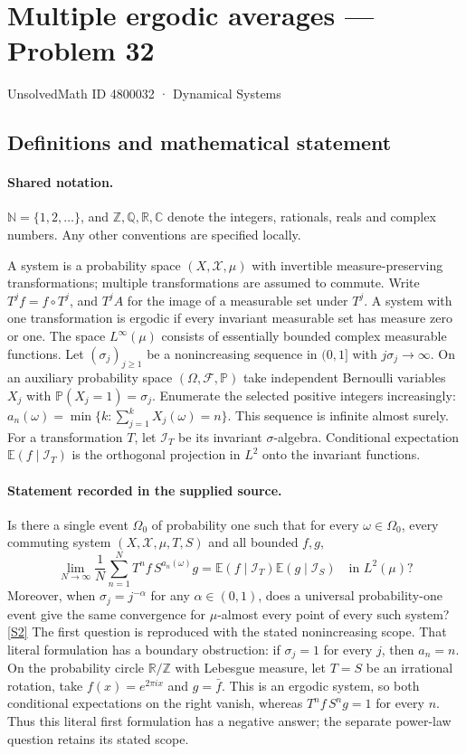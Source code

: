 \documentclass[11pt]{article}
\newcommand{\sref}[2]{\hyperlink{source:#1:#2}{[S#2]}}
\begin{document}
\setcounter{section}{4800031}
\section{Multiple ergodic averages — Problem 32}\label{4800032}
{\small\sffamily UnsolvedMath ID 4800032 · Dynamical Systems}
\subsection{Definitions and mathematical statement}

\paragraph{Shared notation.}$\mathbb N=\{1,2,\ldots\}$, and $\mathbb Z,\mathbb Q,\mathbb R,\mathbb C$ denote the integers, rationals, reals and complex numbers. Any other conventions are specified locally.


A system is a probability space $(X,\mathcal X,\mu)$ with invertible measure-preserving transformations; multiple transformations are assumed to commute. Write $T^j f=f\circ T^j$, and $T^j A$ for the image of a measurable set under $T^j$. A system with one transformation is ergodic if every invariant measurable set has measure zero or one. The space $L^\infty(\mu)$ consists of essentially bounded complex measurable functions. Let $(\sigma_j)_{j\ge1}$ be a nonincreasing sequence in $(0,1]$ with $j\sigma_j\to\infty$. On an auxiliary probability space $(\Omega,\mathcal F,\mathbb P)$ take independent Bernoulli variables $X_j$ with $\mathbb P(X_j=1)=\sigma_j$. Enumerate the selected positive integers increasingly: $a_n(\omega)=\min\{k:\sum_{j=1}^kX_j(\omega)=n\}$. This sequence is infinite almost surely. For a transformation $T$, let $\mathcal I_T$ be its invariant $\sigma$-algebra. Conditional expectation $\mathbb E(f\mid\mathcal I_T)$ is the orthogonal projection in $L^2$ onto the invariant functions.
\paragraph{Statement recorded in the supplied source.}
Is there a single event $\Omega_0$ of probability one such that for every $\omega\in\Omega_0$, every commuting system $(X,\mathcal X,\mu,T,S)$ and all bounded $f,g$, \[\lim_{N\to\infty}\frac1N\sum_{n=1}^NT^nf\,S^{a_n(\omega)}g=\mathbb E(f\mid\mathcal I_T)\mathbb E(g\mid\mathcal I_S)\quad\text{in }L^2(\mu)?\] Moreover, when $\sigma_j=j^{-\alpha}$ for any $\alpha\in(0,1)$, does a universal probability-one event give the same convergence for $\mu$-almost every point of every such system? \sref{4800032}{2}
The first question is reproduced with the stated nonincreasing scope. That literal formulation has a boundary obstruction: if $\sigma_j=1$ for every $j$, then $a_n=n$. On the probability circle $\mathbb R/\mathbb Z$ with Lebesgue measure, let $T=S$ be an irrational rotation, take $f(x)=e^{2\pi i x}$ and $g=\bar f$. This is an ergodic system, so both conditional expectations on the right vanish, whereas $T^nf\,S^ng=1$ for every $n$. Thus this literal first formulation has a negative answer; the separate power-law question retains its stated scope.
\end{document}

